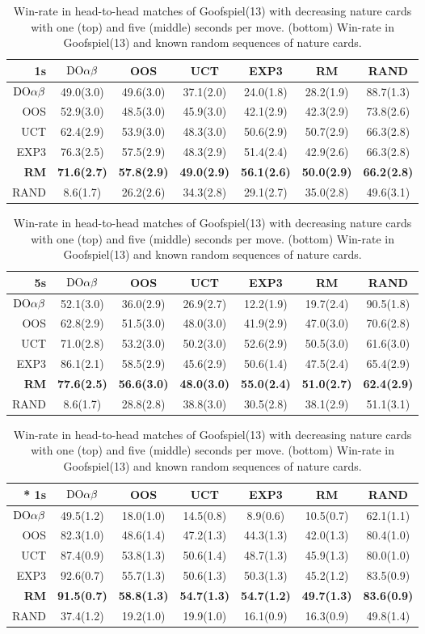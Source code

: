 \begin{table}
\centering
\begin{scriptsize}
\begin{tabular}{|r|cccccc|}\hline
1s&$\textrm{DO}\alpha\beta$&OOS&UCT&EXP3&RM&RAND\\\hline
$\textrm{DO}\alpha\beta$&49.0(3.0)&49.6(3.0)&37.1(2.0)&24.0(1.8)&28.2(1.9)&88.7(1.3)\\
OOS&52.9(3.0)&48.5(3.0)&45.9(3.0)&42.1(2.9)&42.3(2.9)&73.8(2.6)\\
UCT&62.4(2.9)&53.9(3.0)&48.3(3.0)&50.6(2.9)&50.7(2.9)&66.3(2.8)\\
EXP3&76.3(2.5)&57.5(2.9)&48.3(2.9)&51.4(2.4)&42.9(2.6)&66.3(2.8)\\
\textbf{RM}&\textbf{71.6(2.7)}&\textbf{57.8(2.9)}&\textbf{49.0(2.9)}&\textbf{56.1(2.6)}&\textbf{50.0(2.9)}&\textbf{66.2(2.8)}\\
RAND&8.6(1.7)&26.2(2.6)&34.3(2.8)&29.1(2.7)&35.0(2.8)&49.6(3.1)\\
\hline
\end{tabular}
\begin{tabular}{|r|cccccc|}\hline
5s&$\textrm{DO}\alpha\beta$&OOS&UCT&EXP3&RM&RAND\\\hline
$\textrm{DO}\alpha\beta$&52.1(3.0)&36.0(2.9)&26.9(2.7)&12.2(1.9)&19.7(2.4)&90.5(1.8)\\
OOS&62.8(2.9)&51.5(3.0)&48.0(3.0)&41.9(2.9)&47.0(3.0)&70.6(2.8)\\
UCT&71.0(2.8)&53.2(3.0)&50.2(3.0)&52.6(2.9)&50.5(3.0)&61.6(3.0)\\
EXP3&86.1(2.1)&58.5(2.9)&45.6(2.9)&50.6(1.4)&47.5(2.4)&65.4(2.9)\\
\textbf{RM}&\textbf{77.6(2.5)}&\textbf{56.6(3.0)}&\textbf{48.0(3.0)}&\textbf{55.0(2.4)}&\textbf{51.0(2.7)}&\textbf{62.4(2.9)}\\
RAND&8.6(1.7)&28.8(2.8)&38.8(3.0)&30.5(2.8)&38.1(2.9)&51.1(3.1)\\
\hline
\end{tabular}

\begin{tabular}{|r|cccccc|}\hline
* 1s&$\textrm{DO}\alpha\beta$&OOS&UCT&EXP3&RM&RAND\\\hline
$\textrm{DO}\alpha\beta$&49.5(1.2)&18.0(1.0)&14.5(0.8)&8.9(0.6)&10.5(0.7)&62.1(1.1)\\
OOS&82.3(1.0)&48.6(1.4)&47.2(1.3)&44.3(1.3)&42.0(1.3)&80.4(1.0)\\
UCT&87.4(0.9)&53.8(1.3)&50.6(1.4)&48.7(1.3)&45.9(1.3)&80.0(1.0)\\
EXP3&92.6(0.7)&55.7(1.3)&50.6(1.3)&50.3(1.3)&45.2(1.2)&83.5(0.9)\\
\textbf{RM}&\textbf{91.5(0.7)}&\textbf{58.8(1.3)}&\textbf{54.7(1.3)}&\textbf{54.7(1.2)}&\textbf{49.7(1.3)}&\textbf{83.6(0.9)}\\
RAND&37.4(1.2)&19.2(1.0)&19.9(1.0)&16.1(0.9)&16.3(0.9)&49.8(1.4)\\
\hline
\end{tabular}

\end{scriptsize}
\caption{Win-rate in head-to-head matches of Goofspiel(13) with decreasing nature cards with one (top) and five (middle) seconds per move. (bottom) Win-rate in Goofspiel(13) and known random sequences of nature cards.}\label{fig:matches:goof}
\end{table}

